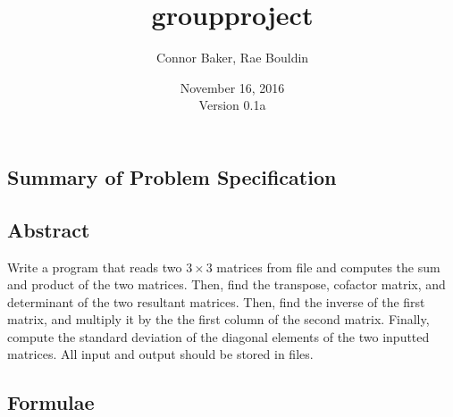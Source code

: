\documentclass[12pt]{article}
\begin{document}
\null
\nointerlineskip 
\vfill
\let \snewpage \newpage
\let \newpage \relax
    \title{groupproject}
    \author{Connor Baker, Rae Bouldin}
    \date{November 16, 2016\\Version 0.1a}
\maketitle
\let \newpage \snewpage
\vfill
\thispagestyle{empty}



\newpage %



\makeatletter
{}
\renewcommand*\l@section{\@dottedtocline{1}{0em}{1.5em}}
\makeatother
\tableofcontents

\clearpage
{}

\begin{center}
\section{Summary of Problem Specification}
\end{center}
\subsection{Abstract}
Write a program that reads two $3\times3$ matrices from file and computes the sum and product of the two matrices. Then, find the transpose, cofactor matrix, and determinant of the two resultant matrices. Then, find the inverse of the first matrix, and multiply it by the the first column of the second matrix. Finally, compute the standard deviation of the diagonal elements of the two inputted matrices.
All input and output should be stored in files.



\newpage %



\begin{center}
\section{Formulae}
\end{center}
\end{document}
